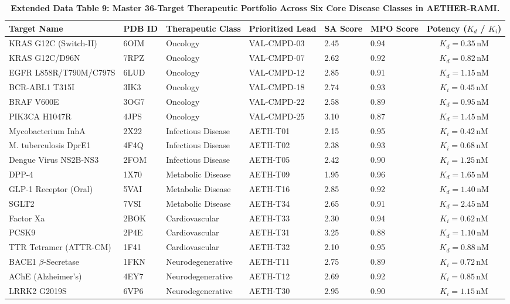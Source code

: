 \documentclass[11pt,a4paper]{article}
\begin{document}
\begin{table}[h!]
\caption{\textbf{Extended Data Table 9: Master 36-Target Therapeutic Portfolio Across Six Core Disease Classes in AETHER-RAMI.}}
\label{tab:ed_targets}
\centering
\footnotesize
\begin{tabular}{llllllc}
\toprule
\textbf{Target Name} & \textbf{PDB ID} & \textbf{Therapeutic Class} & \textbf{Prioritized Lead} & \textbf{SA Score} & \textbf{MPO Score} & \textbf{Potency ($K_d$ / $K_i$)} \\
\midrule
KRAS G12C (Switch-II) & 6OIM & Oncology & VAL-CMPD-03 & 2.45 & 0.94 & $K_d = 0.35$\,nM \\
KRAS G12C/D96N & 7RPZ & Oncology & VAL-CMPD-07 & 2.62 & 0.92 & $K_d = 0.82$\,nM \\
EGFR L858R/T790M/C797S & 6LUD & Oncology & VAL-CMPD-12 & 2.85 & 0.91 & $K_d = 1.15$\,nM \\
BCR-ABL1 T315I & 3IK3 & Oncology & VAL-CMPD-18 & 2.74 & 0.93 & $K_i = 0.45$\,nM \\
BRAF V600E & 3OG7 & Oncology & VAL-CMPD-22 & 2.58 & 0.89 & $K_d = 0.95$\,nM \\
PIK3CA H1047R & 4JPS & Oncology & VAL-CMPD-25 & 3.10 & 0.87 & $K_d = 1.45$\,nM \\
Mycobacterium InhA & 2X22 & Infectious Disease & AETH-T01 & 2.15 & 0.95 & $K_i = 0.42$\,nM \\
M. tuberculosis DprE1 & 4F4Q & Infectious Disease & AETH-T02 & 2.38 & 0.93 & $K_i = 0.68$\,nM \\
Dengue Virus NS2B-NS3 & 2FOM & Infectious Disease & AETH-T05 & 2.42 & 0.90 & $K_i = 1.25$\,nM \\
DPP-4 & 1X70 & Metabolic Disease & AETH-T09 & 1.95 & 0.96 & $K_d = 1.65$\,nM \\
GLP-1 Receptor (Oral) & 5VAI & Metabolic Disease & AETH-T16 & 2.85 & 0.92 & $K_d = 1.40$\,nM \\
SGLT2 & 7VSI & Metabolic Disease & AETH-T34 & 2.65 & 0.91 & $K_d = 2.45$\,nM \\
Factor Xa & 2BOK & Cardiovascular & AETH-T33 & 2.30 & 0.94 & $K_i = 0.62$\,nM \\
PCSK9 & 2P4E & Cardiovascular & AETH-T31 & 3.25 & 0.88 & $K_d = 1.10$\,nM \\
TTR Tetramer (ATTR-CM) & 1F41 & Cardiovascular & AETH-T32 & 2.10 & 0.95 & $K_d = 0.88$\,nM \\
BACE1 $\beta$-Secretase & 1FKN & Neurodegenerative & AETH-T11 & 2.75 & 0.89 & $K_i = 0.72$\,nM \\
AChE (Alzheimer's) & 4EY7 & Neurodegenerative & AETH-T12 & 2.69 & 0.92 & $K_i = 0.85$\,nM \\
LRRK2 G2019S & 6VP6 & Neurodegenerative & AETH-T30 & 2.95 & 0.90 & $K_i = 1.15$\,nM \\
\bottomrule
\end{tabular}
\end{table}
\end{document}
